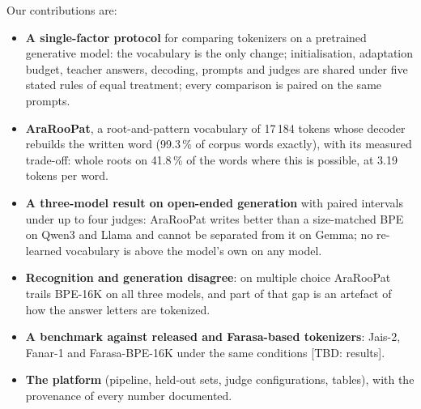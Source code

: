 Our contributions are:
\begin{itemize}
  \item \textbf{A single-factor protocol} for comparing tokenizers on a pretrained generative model: the vocabulary is
  the only change; initialisation, adaptation budget, teacher answers, decoding, prompts and judges are shared under
  five stated rules of equal treatment; every comparison is paired on the same prompts.
  \item \textbf{AraRooPat}, a root-and-pattern vocabulary of 17\,184 tokens whose decoder rebuilds the written word
  (99.3\,\% of corpus words exactly), with its measured trade-off: whole roots on 41.8\,\% of the words where this is
  possible, at 3.19 tokens per word.
  \item \textbf{A three-model result on open-ended generation} with paired intervals under up to four judges: AraRooPat
  writes better than a size-matched BPE on Qwen3 and Llama and cannot be separated from it on Gemma; no re-learned
  vocabulary is above the model's own on any model.
  \item \textbf{Recognition and generation disagree}: on multiple choice AraRooPat trails BPE-16K on all three models,
  and part of that gap is an artefact of how the answer letters are tokenized.
  \item \textbf{A benchmark against released and Farasa-based tokenizers}: Jais-2, Fanar-1 and Farasa-BPE-16K under the
  same conditions [TBD: results].
  \item \textbf{The platform} (pipeline, held-out sets, judge configurations, tables), with the provenance of every
  number documented.
\end{itemize}
